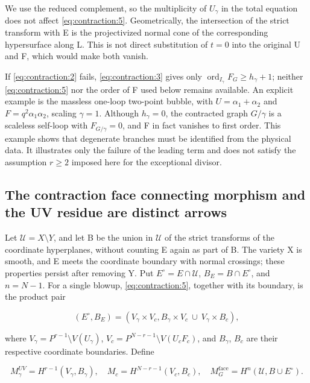 \documentclass[11pt,a4paper,oneside]{article}
\theoremstyle{plain}
\theoremstyle{definition}
\theoremstyle{remark}
\numberwithin{equation}{section}
\begin{document}
We use the reduced complement, so the multiplicity of \(U_\gamma \) in the total equation does not affect \eqref{eq:contraction:5}. Geometrically, the intersection of the strict transform with E is the projectivized normal cone of the corresponding hypersurface along L. This is not direct substitution of \(t=0\) into the original U and F, which would make both vanish.

If \eqref{eq:contraction:2} fails, \eqref{eq:contraction:3} gives only \(\operatorname{ord}_{I_\gamma }F_G\ge h_\gamma +1\); neither \eqref{eq:contraction:5} nor the order of F used below remains available. An explicit example is the massless one-loop two-point bubble, with \(U=\alpha _1+\alpha _2\) and \(F=q^{2}\alpha _1\alpha _2\), scaling \(\gamma ={1}\). Although \(h_\gamma =0\), the contracted graph \(G/\gamma \) is a scaleless self-loop with \(F_{G/\gamma }=0\), and F in fact vanishes to first order. This example shows that degenerate branches must be identified from the physical data. It illustrates only the failure of the leading term and does not satisfy the assumption \(r\ge 2\) imposed here for the exceptional divisor.


\subsection{The contraction face connecting morphism and the UV residue are distinct arrows}\label{sec:contraction:3}

Let \(\mathcal U=X\setminus Y\), and let B be the union in \(\mathcal U\) of the strict transforms of the coordinate hyperplanes, without counting E again as part of B. The variety X is smooth, and E meets the coordinate boundary with normal crossings; these properties persist after removing Y. Put \(E^\circ=E\cap \)\(\mathcal U\), \(B_E=B\cap E^\circ\), and \(n=N- 1\). For a single blowup, \eqref{eq:contraction:5}, together with its boundary, is the product pair

\begin{equation}
(E^\circ,B_E)=(V_\gamma\times V_c,
                    B_\gamma\times V_c\ \cup\ V_\gamma\times B_c),            \label{eq:contraction:6}
\end{equation}

where \(V_\gamma =P^{r- 1}\setminus V(U_\gamma )\), \(V_c=P^{N- r- 1}\setminus V(U_c F_c)\), and \(B_\gamma \), \(B_c\) are their respective coordinate boundaries. Define

\begin{equation}
M_\gamma^{UV}=H^{r-1}(V_\gamma,B_\gamma),\quad
 M_c=H^{N-r-1}(V_c,B_c),\quad
 M_G^{\mathrm{face}}=H^n(\mathcal U,B\cup E^\circ).                \label{eq:contraction:7}
\end{equation}
\end{document}
